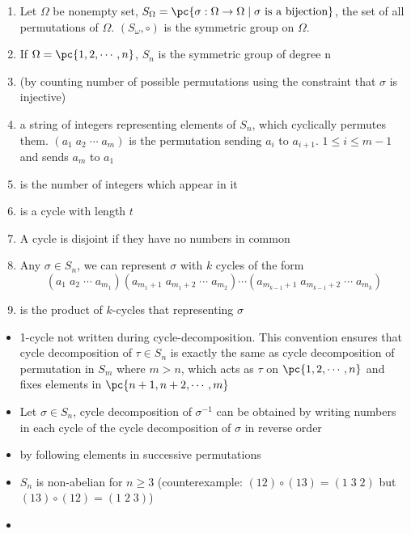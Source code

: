 \documentclass[11pt]{article}
\begin{document}
\begin{definition*}
    \begin{enumerate}
        \item {} Let $\Omega$ be nonempty set, $S_{\Omega} = \pc{\sigma: \Omega \to \Omega \mid \sigma \text{ is a bijection}}$, the set of all permutations of $\Omega$. $(S_{\omega}, \circ)$ is the symmetric group on $\Omega$.
        \item {} If $\Omega = \pc{1,2,\cdots,n}$, $S_n$ is the symmetric group of degree n
        \item {} (by counting number of possible permutations using the constraint that $\sigma$ is injective) 
        \item {} a string of integers representing elements of $S_n$, which cyclically permutes them. $(a_1 \; a_2 \; \cdots \; a_m)$ is the permutation sending $a_i$ to $a_{i+1}$. $1\leq i \leq m-1$ and sends $a_m$ to $a_1$
        \item {} is the number of integers which appear in it
        \item {} is a cycle with length $t$
        \item {} A cycle is disjoint if they have no numbers in common
        \item {} Any $\sigma\in S_n$, we can represent $\sigma$ with $k$ cycles of the form 
        \[
            (a_1 \; a_2\; \cdots\; a_{m_1})(a_{m_1+1}\; a_{m_1+2}\;\cdots \; a_{m_2}) \cdots (a_{m_{k-1}+1}\; a_{m_{k-1}+2} \;\cdots \; a_{m_k})
        \]
        \item {} is the product of $k$-cycles that representing $\sigma$
    \end{enumerate}
    \begin{itemize}
        \item {} 1-cycle not written during cycle-decomposition. This convention ensures that cycle decomposition of $\tau\in S_n$ is exactly the same as cycle decomposition of permutation in $S_{m}$ where $m>n$, which acts as $\tau$ on $\pc{1,2,\cdots,n}$ and fixes elements in $\pc{n+1,n+2,\cdots,m}$
        \item {} Let $\sigma\in S_n$, cycle decomposition of $\sigma^{-1}$ can be obtained by writing numbers in each cycle of the cycle decomposition of $\sigma$ in reverse order
        \item {} by following elements in successive permutations
        \item {} $S_n$ is non-abelian for $n\geq 3$ (counterexample: $(12) \circ(13) = (1\;3\;2)$ but $(13)\circ(12) = (1\;2\;3)$) \item 
    \end{itemize}
\end{definition*}
\end{document}
